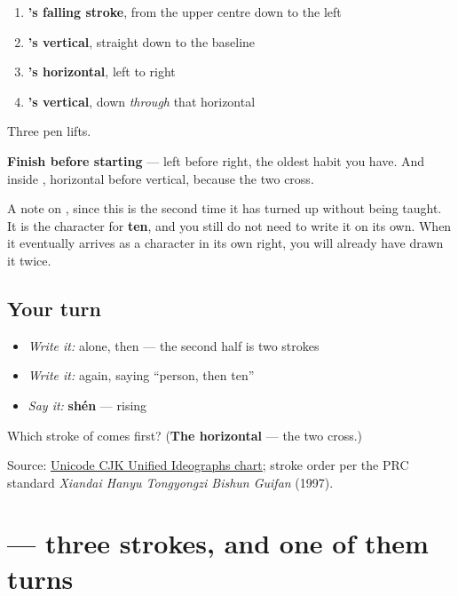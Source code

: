 \begin{enumerate}
\raggedright
  \item \textbf{'s falling stroke}, from the upper centre down to the left
  \item \textbf{'s vertical}, straight down to the baseline
  \item \textbf{'s horizontal}, left to right
  \item \textbf{'s vertical}, down \emph{through} that horizontal
\end{enumerate}

Three pen lifts.

\textbf{Finish  before starting } — left before right, the oldest habit you have. And inside , horizontal before vertical, because the two cross.

A note on , since this is the second time it has turned up without being taught. It is the character for \textbf{ten}, and you still do not need to write it on its own. When it eventually arrives as a character in its own right, you will already have drawn it twice.

\subsection*{Your turn}
\begin{itemize}
\raggedright
  \item \emph{Write it:}  alone, then  — the second half is two strokes
  \item \emph{Write it:}  again, saying \textquotedblleft{}person, then ten\textquotedblright{}
  \item \emph{Say it:} \textbf{shén} — rising
\end{itemize}

\begin{tcolorbox}[breakable,colback=teal!4,colframe=teal!35!black,title={Before you move on}]
Which stroke of  comes first? (\textbf{The horizontal} — the two cross.)

Source: \href{https://www.unicode.org/charts/PDF/U4E00.pdf}{Unicode CJK Unified Ideographs chart}; stroke order per the PRC standard \emph{Xiandai Hanyu Tongyongzi Bishun Guifan} (1997).
\end{tcolorbox}
\section[\texorpdfstring{\zh{么} (me)}{么 (me)}]{ — three strokes, and one of them turns}

